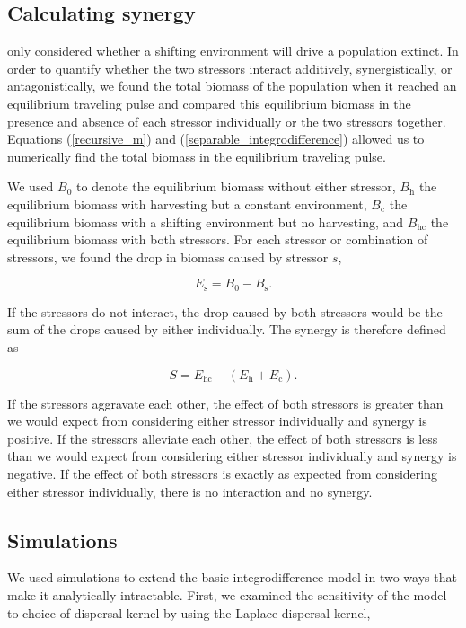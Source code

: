 \documentclass[12pt,english]{article}
\begin{document}
\begin{spacing}{1.9}
\begin{flushleft}
\subsection{Calculating synergy }

\citet{ZhouKot2011} only considered whether a shifting environment will drive a population extinct.   In order to quantify whether the two stressors interact additively, synergistically, or antagonistically, we found the total biomass of the population when it reached an equilibrium traveling pulse and compared this equilibrium biomass in the presence and absence of each stressor individually or the two stressors together.   Equations (\ref{recursive_m}) and (\ref{separable_integrodifference}) allowed us to numerically find the  total biomass in the equilibrium traveling pulse.


We used $B_0$ to denote the equilibrium biomass 
without either stressor, $B_\text{h}$ the equilibrium biomass with harvesting but a constant environment, $B_\text{c}$ the 
equilibrium biomass with a shifting environment but no harvesting, and $B_\text{hc}$ the equilibrium biomass with 
both stressors. For each stressor or combination of stressors, we found the drop in  biomass caused 
by stressor $s$,

\[E_\text{s}=B_0-B_\text{s}.\]

\noindent If the stressors do not interact, the drop caused by both stressors would be the sum of the drops caused by 
either individually. The synergy is therefore defined as

\[S = E_\text{hc}-\left(E_\text{h}+E_\text{c}\right).\]

\noindent If the stressors aggravate each other, the effect of both stressors is greater than  we would expect from considering either stressor individually and synergy is positive. If the stressors alleviate each other, the effect of both stressors is less than we would expect from considering either stressor individually and synergy is negative. If the effect of both stressors is exactly as expected from considering either stressor individually, there is no interaction and no synergy.

\subsection{Simulations }

We used simulations to extend the basic integrodifference model in two ways that make it analytically intractable. First, we examined the sensitivity of the model to choice of dispersal kernel by using the Laplace dispersal kernel, 


\end{flushleft}
\end{spacing}
\end{document}
